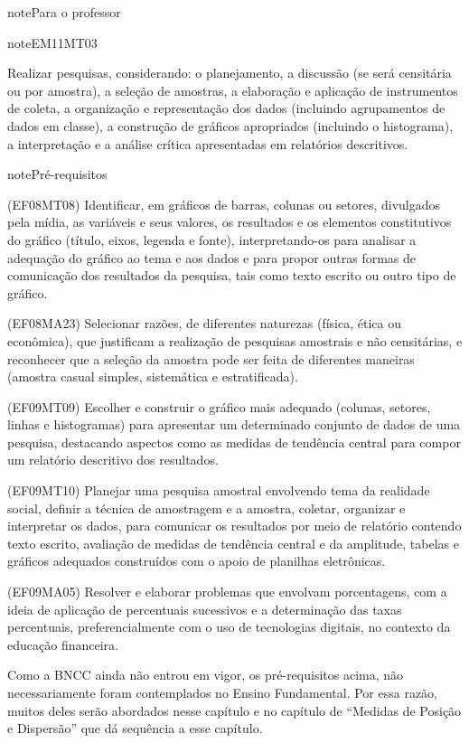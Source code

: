 \begin{sphinxadmonition}{note}{Para o professor}
\begin{sphinxadmonition}{note}{EM11MT03}

Realizar pesquisas, considerando: o planejamento, a discussão (se será censitária ou por amostra), a seleção de amostras, a elaboração e aplicação de instrumentos de coleta, a organização e representação dos dados (incluindo agrupamentos de dados em classe), a construção de gráficos apropriados (incluindo o histograma), a interpretação e a análise crítica apresentadas em relatórios descritivos.

\begin{sphinxadmonition}{note}{Pré-requisitos}

(EF08MT08)
Identificar, em gráficos de barras, colunas ou setores, divulgados pela mídia, as variáveis e seus valores, os resultados e os elementos constitutivos do gráfico (título, eixos, legenda e fonte), interpretando-os para analisar a adequação do gráfico ao tema e aos dados e para propor outras formas de comunicação dos resultados da pesquisa, tais como texto escrito ou outro tipo de gráfico.

(EF08MA23)
Selecionar razões, de diferentes naturezas (física, ética ou econômica), que justificam a realização de pesquisas amostrais e não censitárias, e reconhecer que a seleção da amostra pode ser feita de diferentes maneiras (amostra casual simples, sistemática e estratificada).

(EF09MT09)
Escolher e construir o gráfico mais adequado (colunas, setores, linhas e histogramas) para apresentar um determinado conjunto de dados de uma pesquisa, destacando aspectos como as medidas de tendência central para compor um relatório descritivo dos resultados.

(EF09MT10)
Planejar uma pesquisa amostral envolvendo tema da realidade social, definir a técnica de amostragem e a amostra, coletar, organizar e interpretar os dados, para comunicar os resultados por meio de relatório contendo texto escrito, avaliação de medidas de tendência central e da amplitude, tabelas e gráficos adequados construídos com o apoio de planilhas eletrônicas.

(EF09MA05)
Resolver e elaborar problemas que envolvam porcentagens, com a ideia de aplicação de percentuais sucessivos e a determinação das taxas percentuais, preferencialmente com o uso de tecnologias digitais, no contexto da educação financeira.

 Como a BNCC ainda não entrou em vigor, os pré-requisitos acima, não necessariamente foram contemplados no Ensino Fundamental. Por essa razão, muitos deles serão abordados nesse capítulo e no capítulo de ``Medidas de Posição e Dispersão'' que dá sequência a esse capítulo.


\end{sphinxadmonition}
\end{sphinxadmonition}
\end{sphinxadmonition}
